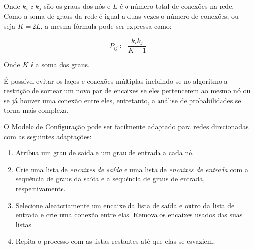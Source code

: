 \documentclass[12pt,a4paper,final]{article}
\newcommand{\defn}{\coloneqq} %
\begin{document}

Onde $k_i$ e $k_j$ são os graus dos nós e $L$ é o número total de conexões na rede. Como a soma de graus da rede é igual a duas vezes o número de conexões, ou seja $K = 2L$, a mesma fórmula pode ser expressa como:

\begin{equation}
P_{ij} \defn \frac{k_i k_j}{K - 1}
\end{equation}

Onde $K$ é a soma dos graus.

É possível evitar os laços e conexões múltiplas incluindo-se no algoritmo a restrição de sortear um novo par de encaixes se eles pertencerem ao mesmo nó ou se já houver uma conexão entre eles, entretanto, a análise de probabilidades se torna mais complexa.

O Modelo de Configuração pode ser facilmente adaptado para redes direcionadas com as seguintes adaptações:


\begin{enumerate}
\item Atribua um grau de saída e um grau de entrada a cada nó.
\item Crie uma lista de \textit{encaixes de saída} e uma lista de \textit{encaixes de entrada} com a sequência de graus da saída e a sequência de graus de entrada, respectivamente.
\item Selecione aleatoriamente um encaixe da lista de saída e outro da lista de entrada e crie uma conexão entre elas. Remova os encaixes usados das suas listas.
\item Repita o processo com as listas restantes até que elas se esvaziem.
\end{enumerate}
\end{document}
